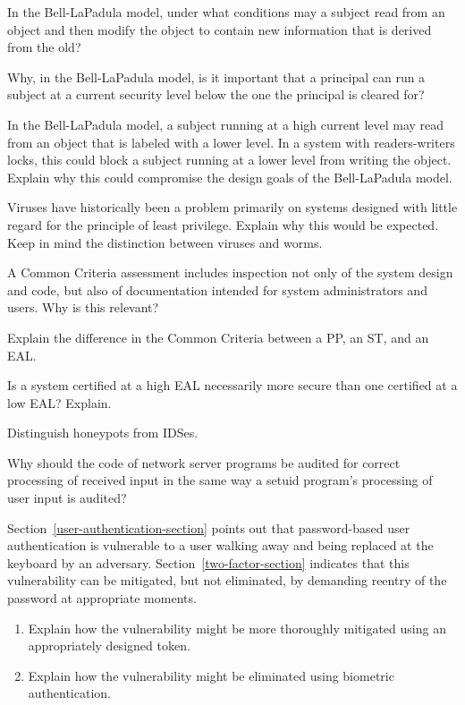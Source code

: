 \begin{chapterEnumerate}
\item
In the Bell-LaPadula model, under what conditions may a subject read
from an object and then modify the object to contain new information
that is derived from the old?

\item
Why, in the Bell-LaPadula model, is it important that a principal can
run a subject at a current security level below the one the principal
is cleared for?

\item
In the Bell-LaPadula model, a subject running at a high current level
may read from an object that is labeled with a lower level.  In a
system with readers-writers locks, this could block a subject running
at a lower level from writing the object.  Explain why this could
compromise the design goals of the Bell-LaPadula model.

\item
Viruses have historically been a problem primarily on systems designed
with little regard for the principle of least privilege.  Explain why
this would be expected.  Keep in mind the distinction between viruses
and worms.

\item
A Common Criteria assessment includes inspection not only of the
system design and code, but also of documentation intended for system
administrators and users.  Why is this relevant?

\item
Explain the difference in the Common Criteria between a PP, an ST, and
an EAL.

\item
Is a system certified at a high EAL necessarily more secure than one
certified at a low EAL?  Explain.

\item
Distinguish honeypots from IDSes.

\item
Why should the code of network server programs be audited for correct
processing of received input in the same way a setuid program's
processing of user input is audited?

\item
Section~\ref{user-authentication-section} points out that password-based user authentication is vulnerable to a user walking away and being replaced at the keyboard by an adversary.  Section~\ref{two-factor-section} indicates that this vulnerability can be mitigated, but not eliminated, by demanding reentry of the password at appropriate moments.
\begin{enumerate}
\item
Explain how the vulnerability might be more thoroughly mitigated using an appropriately designed token.
\item
Explain how the vulnerability might be eliminated using biometric authentication.
\end{enumerate}

\end{chapterEnumerate}

